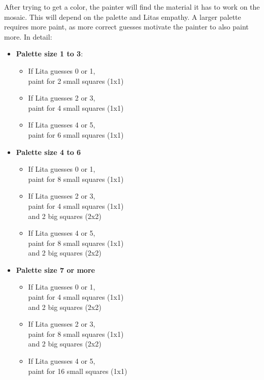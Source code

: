 \documentclass[twocolumn]{article}
\begin{document}
After trying to get a color, the painter will find the material it has to work on the mosaic. This will depend on the palette and Litas empathy. A larger palette requires more paint, as more correct guesses motivate the painter to also paint more. In detail: 

{


\begin{itemize}
    \item \textbf{Palette size 1 to 3}:
    \begin{itemize}
        \item If Lita guesses 0 or 1, \\paint for 2 small squares (1x1)
        \item If Lita guesses 2 or 3, \\paint for 4 small squares (1x1)
        \item If Lita guesses 4 or 5, \\paint for 6 small squares (1x1)
    \end{itemize}
    \item \textbf{Palette size 4 to 6}
    \begin{itemize}
        \item If Lita guesses 0 or 1, \\paint for 8 small squares (1x1)
        \item If Lita guesses 2 or 3, \\paint for 4 small squares (1x1) \\and 2 big squares (2x2)
        \item If Lita guesses 4 or 5, \\paint for 8 small squares (1x1) \\and 2 big squares (2x2)
    \end{itemize}
    \item \textbf{Palette size 7 or more}
    \begin{itemize}
        \item If Lita guesses 0 or 1, \\paint for 4 small squares (1x1) \\and 2 big squares (2x2)
        \item If Lita guesses 2 or 3, \\paint for 8 small squares (1x1) \\and 2 big squares (2x2)
        \item If Lita guesses 4 or 5, \\paint for 16 small squares (1x1)
    \end{itemize}
\end{itemize}

}
\end{document}
